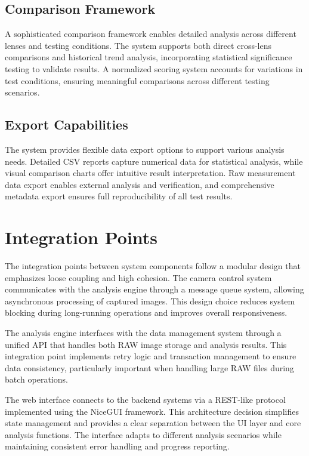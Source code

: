 \subsection{Comparison Framework}
A sophisticated comparison framework enables detailed analysis across different lenses and testing conditions. The system supports both direct cross-lens comparisons and historical trend analysis, incorporating statistical significance testing to validate results. A normalized scoring system accounts for variations in test conditions, ensuring meaningful comparisons across different testing scenarios.

\subsection{Export Capabilities}
The system provides flexible data export options to support various analysis needs. Detailed CSV reports capture numerical data for statistical analysis, while visual comparison charts offer intuitive result interpretation. Raw measurement data export enables external analysis and verification, and comprehensive metadata export ensures full reproducibility of all test results.

\section{Integration Points} 
The integration points between system components follow a modular design that emphasizes loose coupling and high cohesion. The camera control system communicates with the analysis engine through a message queue system, allowing asynchronous processing of captured images. This design choice reduces system blocking during long-running operations and improves overall responsiveness.

The analysis engine interfaces with the data management system through a unified API that handles both RAW image storage and analysis results. This integration point implements retry logic and transaction management to ensure data consistency, particularly important when handling large RAW files during batch operations.

The web interface connects to the backend systems via a REST-like protocol implemented using the NiceGUI framework. This architecture decision simplifies state management and provides a clear separation between the UI layer and core analysis functions. The interface adapts to different analysis scenarios while maintaining consistent error handling and progress reporting.


